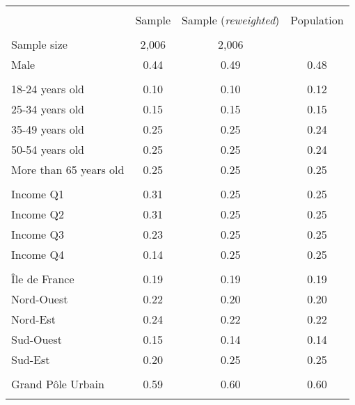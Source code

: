 \begin{tabular}{lccc}
\toprule
\hline \\[-1.8ex]
\noalign{\smallskip}  & Sample & Sample (\textit{reweighted}) & Population\\
\hline \\[-1.8ex] 
Sample size & 2,006 & 2,006 &  \\
\noalign{\smallskip}\hline \noalign{\smallskip}Male & 0.44 & 0.49 & 0.48\\ 
\\
18-24 years old & 0.10 & 0.10 & 0.12\\
25-34 years old & 0.15 & 0.15 & 0.15\\
35-49 years old & 0.25 & 0.25 & 0.24\\
50-54 years old & 0.25 & 0.25 & 0.24\\
More than 65 years old & 0.25 & 0.25 & 0.25\\ 
\\
Income Q1 & 0.31 & 0.25 & 0.25\\
Income Q2 & 0.31 & 0.25 & 0.25\\
Income Q3 & 0.23 & 0.25 & 0.25\\
Income Q4 & 0.14 & 0.25 & 0.25\\
\\
Île de France & 0.19 & 0.19 & 0.19\\
Nord-Ouest & 0.22 & 0.20 & 0.20\\
Nord-Est & 0.24 & 0.22 & 0.22\\
Sud-Ouest & 0.15 & 0.14 & 0.14\\
Sud-Est & 0.20 & 0.25 & 0.25\\
\\
Grand Pôle Urbain & 0.59 & 0.60 & 0.60\\
\\
\end{tabular}